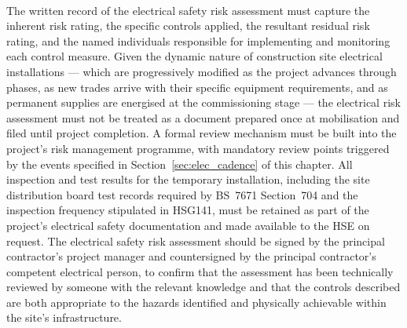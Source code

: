 \paragraph{}
The written record of the electrical safety risk assessment must capture the inherent risk rating, the specific controls applied, the resultant residual risk rating, and the named individuals responsible for implementing and monitoring each control measure. Given the dynamic nature of construction site electrical installations --- which are progressively modified as the project advances through phases, as new trades arrive with their specific equipment requirements, and as permanent supplies are energised at the commissioning stage --- the electrical risk assessment must not be treated as a document prepared once at mobilisation and filed until project completion. A formal review mechanism must be built into the project's risk management programme, with mandatory review points triggered by the events specified in Section~\ref{sec:elec_cadence} of this chapter. All inspection and test results for the temporary installation, including the site distribution board test records required by BS~7671 Section~704 and the inspection frequency stipulated in HSG141, must be retained as part of the project's electrical safety documentation and made available to the HSE on request. The electrical safety risk assessment should be signed by the principal contractor's project manager and countersigned by the principal contractor's competent electrical person, to confirm that the assessment has been technically reviewed by someone with the relevant knowledge and that the controls described are both appropriate to the hazards identified and physically achievable within the site's infrastructure.

